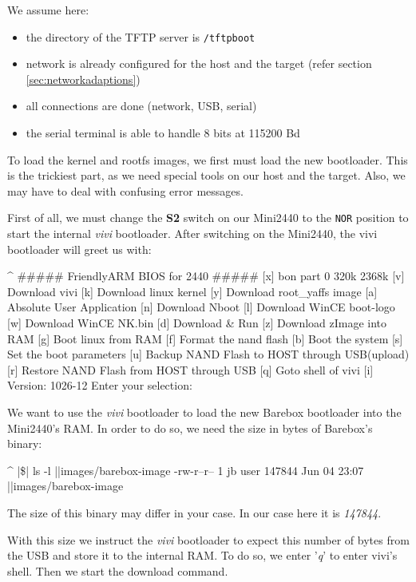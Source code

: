 We assume here:

\begin{itemize}
 \item the directory of the TFTP server is \texttt{/tftpboot}
 \item network is already configured for the host and the target
       (refer section \ref{sec:networkadaptions})
 \item all connections are done (network, USB, serial)
 \item the serial terminal is able to handle 8 bits at 115200 Bd
\end{itemize}

To load the kernel and rootfs images, we first must load the new bootloader.
This is the trickiest part, as we need special tools on our host and the target.
Also, we may have to deal with confusing error messages.

First of all, we must change the \textbf{S2} switch on our Mini2440
to the \texttt{NOR} position to start the internal \textit{vivi} bootloader.
After switching on the Mini2440, the vivi bootloader will greet us
with:

\begin{ptxshell}[escapechar=|]{^}
##### FriendlyARM BIOS for 2440 #####
[x] bon part 0 320k 2368k
[v] Download vivi
[k] Download linux kernel
[y] Download root_yaffs image
[a] Absolute User Application
[n] Download Nboot
[l] Download WinCE boot-logo
[w] Download WinCE NK.bin
[d] Download & Run
[z] Download zImage into RAM
[g] Boot linux from RAM
[f] Format the nand flash
[b] Boot the system
[s] Set the boot parameters
[u] Backup NAND Flash to HOST through USB(upload)
[r] Restore NAND Flash from HOST through USB
[q] Goto shell of vivi
[i] Version: 1026-12
Enter your selection:
\end{ptxshell}

We want to use the \textit{vivi} bootloader to load the new Barebox bootloader
into the Mini2440's RAM. In order to do so, we need the size in bytes of
Barebox's binary:

\begin{ptxshell}[escapechar=|]{^}
|\$| ls -l |\ptxdistPlatformDir |images/barebox-image
-rw-r--r-- 1 jb user 147844 Jun 04 23:07 |\ptxdistPlatformDir |images/barebox-image
\end{ptxshell}

The size of this binary may differ in your case. In our case here it is
\textit{147844}.

With this size we instruct the \textit{vivi} bootloader to expect this number of
bytes from the USB and store it to the internal RAM. To do so, we enter
'\textit{q}' to enter vivi's shell. Then we start the download command.

